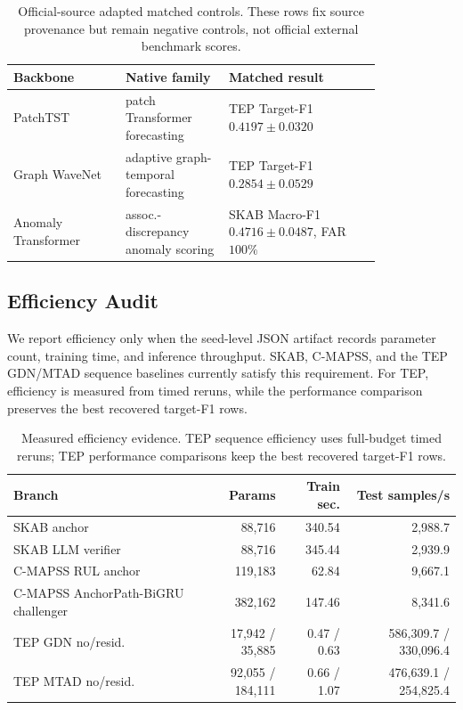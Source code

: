 \documentclass[letterpaper]{article}
\begin{document}
\begin{table}[t]
\centering
\caption{Official-source adapted matched controls. These rows fix source provenance but remain negative controls, not official external benchmark scores.}
\label{tab:backbone-controls}
\scriptsize
\setlength{\tabcolsep}{3pt}
\begin{tabular}{p{0.25\linewidth}p{0.23\linewidth}p{0.34\linewidth}}
\toprule
Backbone & Native family & Matched result \\
\midrule
PatchTST & patch Transformer forecasting & TEP Target-F1 $0.4197 \pm 0.0320$ \\
Graph WaveNet & adaptive graph-temporal forecasting & TEP Target-F1 $0.2854 \pm 0.0529$ \\
Anomaly Transformer & assoc.-discrepancy anomaly scoring & SKAB Macro-F1 $0.4716 \pm 0.0487$, FAR $100\%$ \\
\bottomrule
\end{tabular}
\end{table}

\subsection{Efficiency Audit}

We report efficiency only when the seed-level JSON artifact records parameter count, training time, and inference throughput. SKAB, C-MAPSS, and the TEP GDN/MTAD sequence baselines currently satisfy this requirement. For TEP, efficiency is measured from timed reruns, while the performance comparison preserves the best recovered target-F1 rows.

\begin{table}[t]
\centering
\caption{Measured efficiency evidence. TEP sequence efficiency uses full-budget timed reruns; TEP performance comparisons keep the best recovered target-F1 rows.}
\label{tab:efficiency}
\small
\begin{tabular}{lrrr}
\toprule
Branch & Params & Train sec. & Test samples/s \\
\midrule
SKAB anchor & 88,716 & 340.54 & 2,988.7 \\
SKAB LLM verifier & 88,716 & 345.44 & 2,939.9 \\
C-MAPSS RUL anchor & 119,183 & 62.84 & 9,667.1 \\
C-MAPSS AnchorPath-BiGRU challenger & 382,162 & 147.46 & 8,341.6 \\
TEP GDN no/resid. & 17,942 / 35,885 & 0.47 / 0.63 & 586,309.7 / 330,096.4 \\
TEP MTAD no/resid. & 92,055 / 184,111 & 0.66 / 1.07 & 476,639.1 / 254,825.4 \\
\bottomrule
\end{tabular}
\end{table}
\end{document}
